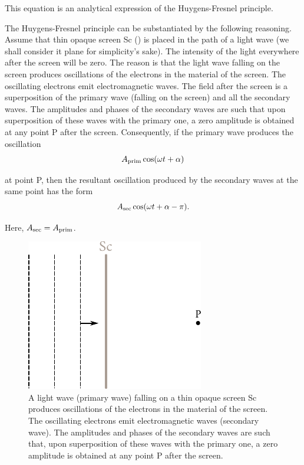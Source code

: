 \noindent
This equation is an analytical expression of the Huygens-Fresnel principle.

The Huygens-Fresnel principle can be substantiated
by the following reasoning.
Assume that thin opaque screen Sc () is
placed in the path of a light wave (we shall consider it plane for simplicity's sake).
The intensity of the light everywhere after the screen will be zero.
The reason is that the light wave falling on the screen produces oscillations of the electrons in the material of the screen.
The oscillating electrons emit electromagnetic waves.
The field after the screen is a superposition of the primary wave (falling on the screen) and all the secondary waves.
The amplitudes and phases of the secondary waves are such that upon superposition of these waves with the primary one, a zero amplitude is obtained at any point P after the screen.
Consequently, if the primary wave produces the oscillation
\begin{equation*}
    A_{\text{prim}} \cos(\omega t + \alpha)
\end{equation*}

\noindent
at point P, then the resultant oscillation produced by the secondary waves at the same point has the form
\begin{equation*}
    A_{\text{sec}} \cos(\omega t + \alpha - \pi).
\end{equation*}

\noindent
Here, $A_{\text{sec}}=A_{\text{prim}}$.

\begin{figure}[t]
	\begin{center}
		\includegraphics[scale=1]{figures/ch_18/fig_18_3.pdf}
        \caption[]{A light wave (primary wave) falling on a thin opaque screen Sc produces oscillations of the electrons in the material of the screen. The oscillating electrons emit electromagnetic waves (secondary wave). The amplitudes and phases of the secondary waves are such that, upon superposition of these waves with the primary one, a zero amplitude is obtained at any point P after the screen.}
		\label{fig:18_3}
	\end{center}
	\vspace{-0.8cm}
\end{figure}

